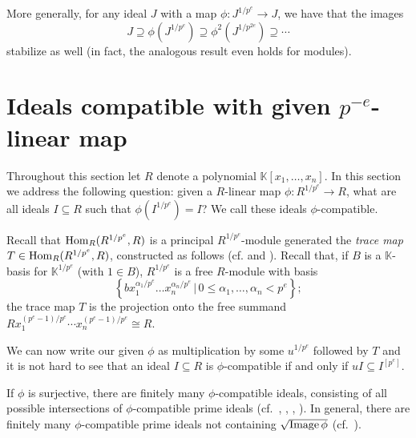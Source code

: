 \documentclass{amsart}
\renewcommand{\leq}{\leqslant}
\begin{document}
\medskip
{\small
{}
}\medskip




More generally, for any ideal $J$ with a map $\phi : J^{1/p^e} \to J$, we have that the images
\[
J \supseteq \phi(J^{1/p^e}) \supseteq \phi^2(J^{1/p^{2e}}) \supseteq \cdots
\]
stabilize as well (in fact, the analogous result even holds for modules).


\section{Ideals compatible with given $p^{-e}$-linear map}\label{Section: compatible ideals}

Throughout this section let $R$ denote a polynomial $\mathbb{K}[x_1, \dots, x_n]$. In this section we address the following question:
given a $R$-linear map $\phi: R^{1/p^e} \rightarrow R$, what are all ideals $I\subseteq R$ such that $\phi(I^{1/p^e})=I$?
We call these ideals $\phi$-compatible.

Recall that  $\operatorname{Hom}_R( R^{1/p^e}, R)$  is a principal $R^{1/p^e}$-module generated
the \emph{trace map} $T\in \operatorname{Hom}_R(R^{1/p^e}, R)$, constructed as follows (cf. \cite[Lemma 1.6]{FedderFPureRat} and \cite[Example 1.3.1]{BrionKumarFrobeniusSplitting}).
Recall that, if $B$ is a $\mathbb{K}$-basis for $\mathbb{K}^{1/p^e}$ (with $1\in B$),
$R^{1/p^e}$ is a free $R$-module with basis
$$\left\{ b x_1^{\alpha_1/p^e} \dots x_n^{\alpha_n/p^e} \,|\, 0\leq \alpha_1, \dots, \alpha_n < p^e \right\} ;$$
the trace map $T$ is the projection onto the free summand
$R x_1^{(p^e-1)/p^e} \cdots x_n^{(p^e-1)/p^e}\cong R$.

We can now write our given $\phi$ as multiplication by some $u^{1/p^e}$ followed by $T$ and it is not hard to see that
an ideal $I\subseteq R$ is $\phi$-compatible if and only if $u I \subseteq I^{[p^e]}$.

\begin{theorem}\label{Theorem: finitely many compatible primes}
If $\phi$ is surjective, there are finitely many $\phi$-compatible ideals, consisting of all possible intersections
of $\phi$-compatible prime ideals \textup(cf.\ \cite{KumarMehtaFiniteness}, \cite{SchwedeFAdjunction},
\cite{SharpGradedAnnihilatorsOfModulesOverTheFrobeniusSkewPolynomialRing}, \cite{EnescuHochsterTheFrobeniusStructureOfLocalCohomology}\textup).
In general, there are finitely many $\phi$-compatible prime ideals not containing $\sqrt{\operatorname{Image} \phi}$ \textup(cf.\ \cite{KatzmanSchwedeAlgorithm}\textup).

\end{theorem}
\end{document}
